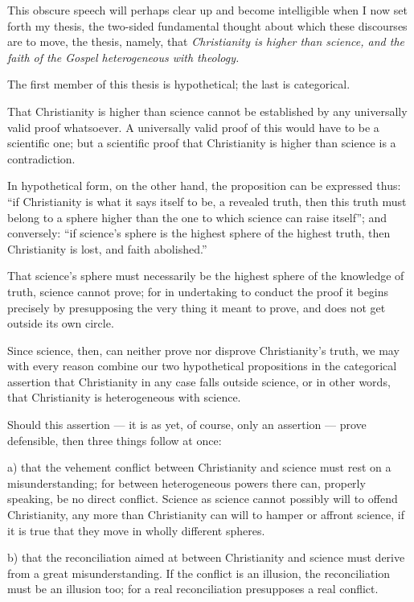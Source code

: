 \documentclass[12pt,a4paper]{book}
\begin{document}
This obscure speech will perhaps clear up and become intelligible when I now
set forth my thesis, the two-sided fundamental thought about which these
discourses are to move, the thesis, namely, that \emph{Christianity is higher
than science, and the faith of the Gospel heterogeneous with theology.}

The first member of this thesis is hypothetical; the last is categorical.

That Christianity is higher than science cannot be established by any
universally valid proof whatsoever. A universally valid proof of this would
have to be a scientific one; but a scientific proof that Christianity is higher
than science is a contradiction.

In hypothetical form, on the other hand, the proposition can be expressed thus:
``if Christianity is what it says itself to be, a revealed truth, then this
truth must belong to a sphere higher than the one to which science can raise
itself''; and conversely: ``if science's sphere is the highest sphere of the
highest truth, then Christianity is lost, and faith abolished.''

That science's sphere must necessarily be the highest sphere of the knowledge
of truth, science cannot prove;
for in undertaking to conduct the proof it begins precisely by presupposing the
very thing it meant to prove, and does not get outside its own circle.

Since science, then, can neither prove nor disprove Christianity's truth, we
may with every reason combine our two hypothetical propositions in the
categorical assertion that Christianity in any case falls outside science, or
in other words, that Christianity is heterogeneous with science.

Should this assertion --- it is as yet, of course, only an assertion --- prove
defensible, then three things follow at once:

a) that the vehement conflict between Christianity and science must rest on a
misunderstanding; for between heterogeneous powers there can, properly
speaking, be no direct conflict. Science as science cannot possibly will to
offend Christianity, any more than Christianity can will to hamper or affront
science, if it is true that they move in wholly different spheres.

b) that the reconciliation aimed at between Christianity and science must
derive from a great misunderstanding. If the conflict is an illusion, the
reconciliation must be an illusion too; for a real reconciliation presupposes a
real conflict.
\end{document}
